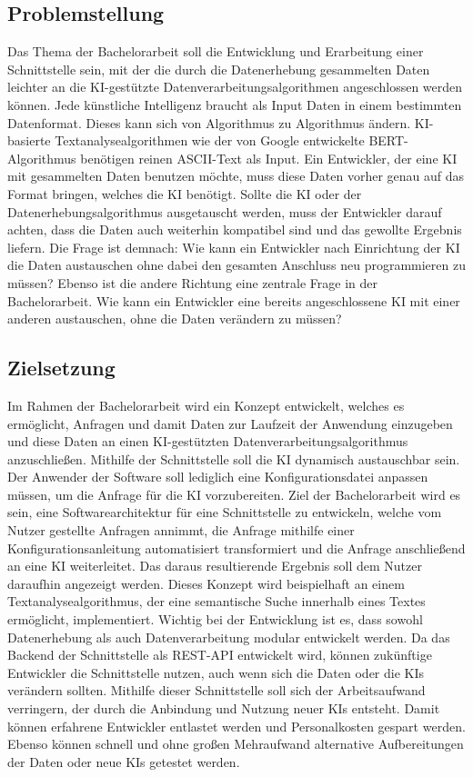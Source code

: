 \subsection{Problemstellung}
Das Thema der Bachelorarbeit soll die Entwicklung und Erarbeitung einer Schnittstelle sein, mit der die durch die Datenerhebung gesammelten Daten leichter an die KI-gestützte Datenverarbeitungsalgorithmen angeschlossen werden können. Jede künstliche Intelligenz braucht als Input Daten in einem bestimmten Datenformat. Dieses kann sich von Algorithmus zu Algorithmus ändern. KI-basierte Textanalysealgorithmen wie der von Google entwickelte BERT-Algorithmus benötigen reinen ASCII-Text als Input. Ein Entwickler, der eine KI mit gesammelten Daten benutzen möchte, muss diese Daten vorher genau auf das Format bringen, welches die KI benötigt. Sollte die KI oder der Datenerhebungsalgorithmus ausgetauscht werden, muss der Entwickler darauf achten, dass die Daten auch weiterhin kompatibel sind und das gewollte Ergebnis liefern. Die Frage ist demnach: \glqq Wie kann ein Entwickler nach Einrichtung der KI die Daten austauschen ohne dabei den gesamten Anschluss neu programmieren zu müssen?\grqq{} Ebenso ist die andere Richtung eine zentrale Frage in der Bachelorarbeit. \glqq Wie kann ein Entwickler eine bereits angeschlossene KI mit einer anderen austauschen, ohne die Daten verändern zu müssen? \grqq{}

\subsection{Zielsetzung}
Im Rahmen der Bachelorarbeit wird ein Konzept entwickelt, welches es ermöglicht, Anfragen und damit Daten zur Laufzeit der Anwendung einzugeben und diese Daten an einen KI-gestützten Datenverarbeitungsalgorithmus anzuschließen. Mithilfe der Schnittstelle soll die KI dynamisch austauschbar sein. Der Anwender der Software soll lediglich eine Konfigurationsdatei anpassen müssen, um die Anfrage für die KI vorzubereiten. Ziel der Bachelorarbeit wird es sein, eine Softwarearchitektur für eine Schnittstelle zu entwickeln, welche vom Nutzer gestellte Anfragen annimmt, die Anfrage mithilfe einer Konfigurationsanleitung automatisiert transformiert und die Anfrage anschließend an eine KI weiterleitet. Das daraus resultierende Ergebnis soll dem Nutzer daraufhin angezeigt werden. Dieses Konzept wird beispielhaft an einem Textanalysealgorithmus, der eine semantische Suche innerhalb eines Textes ermöglicht, implementiert. Wichtig bei der Entwicklung ist es, dass sowohl Datenerhebung als auch Datenverarbeitung modular entwickelt werden. Da das Backend der Schnittstelle als REST-API entwickelt wird, können zukünftige Entwickler die Schnittstelle nutzen, auch wenn sich die Daten oder die KIs verändern sollten. Mithilfe dieser Schnittstelle soll sich der Arbeitsaufwand verringern, der durch die Anbindung und Nutzung neuer KIs entsteht. Damit können erfahrene Entwickler entlastet werden und Personalkosten gespart werden. Ebenso können schnell und ohne großen Mehraufwand alternative Aufbereitungen der Daten oder neue KIs getestet werden.

